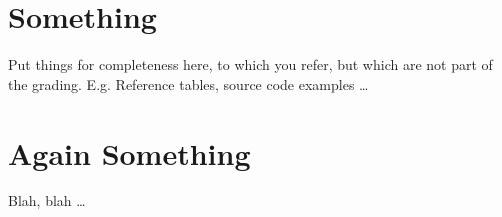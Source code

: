 
\chapter{Something}\label{sec:something}

Put things for completeness here, to which you refer, but which are not part of the grading.
E.g. Reference tables, source code examples \dots

 \cleardoublepage


\chapter{Again Something}\label{sec:again_something}

Blah, blah \dots

 \cleardoublepage
